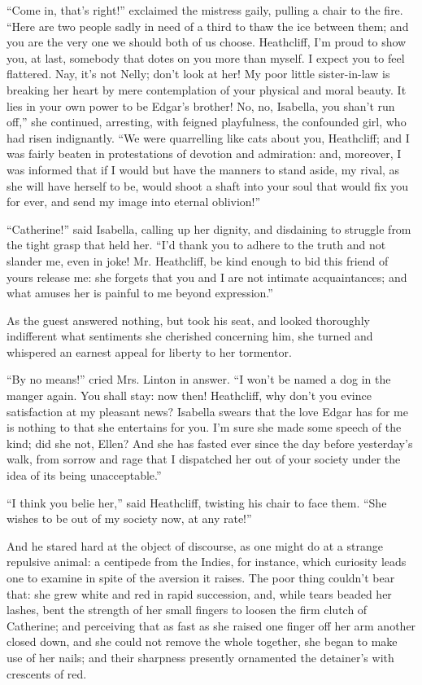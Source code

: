 \par “Come in, that's right!” exclaimed the mistress gaily, pulling a chair to the fire. “Here are two people sadly in need of a third to thaw the ice between them; and you are the very one we should both of us choose. Heathcliff, I'm proud to show you, at last, somebody that dotes on you more than myself. I expect you to feel flattered. Nay, it's not Nelly; don't look at her! My poor little sister-in-law is breaking her heart by mere contemplation of your physical and moral beauty. It lies in your own power to be Edgar's brother! No, no, Isabella, you shan't run off,” she continued, arresting, with feigned playfulness, the confounded girl, who had risen indignantly. “We were quarrelling like cats about you, Heathcliff; and I was fairly beaten in protestations of devotion and admiration: and, moreover, I was informed that if I would but have the manners to stand aside, my rival, as she will have herself to be, would shoot a shaft into your soul that would fix you for ever, and send my image into eternal oblivion!”
\par “Catherine!” said Isabella, calling up her dignity, and disdaining to struggle from the tight grasp that held her. “I'd thank you to adhere to the truth and not slander me, even in joke! Mr. Heathcliff, be kind enough to bid this friend of yours release me: she forgets that you and I are not intimate acquaintances; and what amuses her is painful to me beyond expression.”
\par As the guest answered nothing, but took his seat, and looked thoroughly indifferent what sentiments she cherished concerning him, she turned and whispered an earnest appeal for liberty to her tormentor.
\par “By no means!” cried Mrs. Linton in answer. “I won't be named a dog in the manger again. You shall stay: now then! Heathcliff, why don't you evince satisfaction at my pleasant news? Isabella swears that the love Edgar has for me is nothing to that she entertains for you. I'm sure she made some speech of the kind; did she not, Ellen? And she has fasted ever since the day before yesterday's walk, from sorrow and rage that I dispatched her out of your society under the idea of its being unacceptable.”
\par “I think you belie her,” said Heathcliff, twisting his chair to face them. “She wishes to be out of my society now, at any rate!”
\par And he stared hard at the object of discourse, as one might do at a strange repulsive animal: a centipede from the Indies, for instance, which curiosity leads one to examine in spite of the aversion it raises. The poor thing couldn't bear that: she grew white and red in rapid succession, and, while tears beaded her lashes, bent the strength of her small fingers to loosen the firm clutch of Catherine; and perceiving that as fast as she raised one finger off her arm another closed down, and she could not remove the whole together, she began to make use of her nails; and their sharpness presently ornamented the detainer's with crescents of red.
